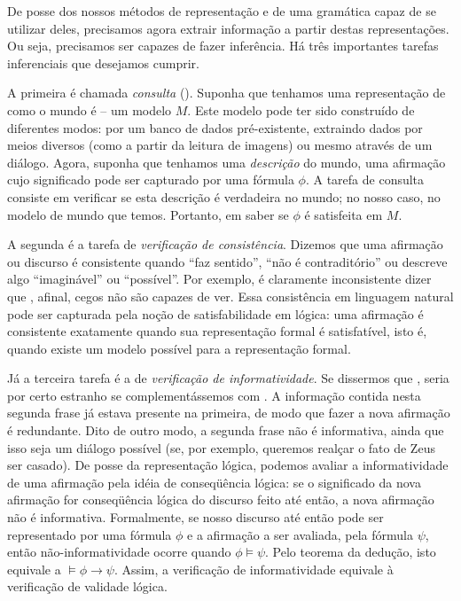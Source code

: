 


	De posse dos nossos métodos de representação e de uma gramática capaz de se utilizar deles, precisamos agora extrair informação a partir destas representações. Ou seja, precisamos ser capazes de fazer inferência.
%
	Há três importantes tarefas inferenciais que desejamos cumprir.
	
	A primeira é chamada \textit{consulta} (). Suponha que tenhamos uma representação de como o mundo é -- um modelo $M$. Este modelo pode ter sido construído de diferentes modos: por um banco de dados pré-existente, extraindo dados por meios diversos (como a partir da leitura de imagens) ou mesmo através de um diálogo. Agora, suponha que tenhamos uma \textit{descrição} do mundo, uma afirmação cujo significado pode ser capturado por uma fórmula $\phi$. A tarefa de consulta consiste em verificar se esta descrição é verdadeira no mundo; no nosso caso, no modelo de mundo que temos. Portanto, em saber se $\phi$ é satisfeita em $M$.
	
	A segunda é a tarefa de \textit{verificação de consistência}. Dizemos que uma afirmação ou discurso é consistente quando ``faz sentido'', ``não é contraditório'' ou descreve algo ``imaginável'' ou ``possível''. Por exemplo, é claramente inconsistente dizer que , afinal, cegos não são capazes de ver. Essa consistência em linguagem natural pode ser capturada pela noção de satisfabilidade em lógica: uma afirmação é consistente exatamente quando sua representação formal é satisfatível, isto é, quando existe um modelo possível para a representação formal.
	
	Já a terceira tarefa é a de \textit{verificação de informatividade}. Se dissermos que , seria por certo estranho se complementássemos com . A informação contida nesta segunda frase já estava presente na primeira, de modo que fazer a nova afirmação é redundante. Dito de outro modo, a segunda frase não é informativa, ainda que isso seja um diálogo possível (se, por exemplo, queremos realçar o fato de Zeus ser casado). De posse da representação lógica, podemos avaliar a informatividade de uma afirmação pela idéia de conseqüência lógica: se o significado da nova afirmação for conseqüência lógica do discurso feito até então, a nova afirmação não é informativa. Formalmente, se nosso discurso até então pode ser representado por uma fórmula $\phi$ e a afirmação a ser avaliada, pela fórmula $\psi$, então não-informatividade ocorre quando $\phi \models \psi$. Pelo teorema da dedução, isto equivale a $\models \phi \rightarrow \psi$. Assim, a verificação de informatividade equivale à verificação de validade lógica.
	
